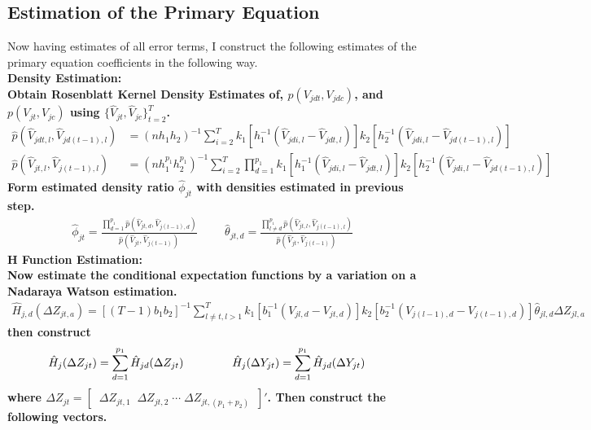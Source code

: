 \documentclass[10pt]{article}
\begin{document}
\subsection*{Estimation of the Primary Equation} 
%
Now having estimates of all error terms, I construct the following estimates of the primary equation coefficients in the following way. \\
%
\noindent \bf Density Estimation: \rm  \\
%
Obtain Rosenblatt Kernel Density Estimates of, $p(V_{jdt},V_{jdc})$, and $p(V_{jt},V_{jc})$ using $\{\hat{V}_{jt}, \hat{V}_{jc}\}_{t=2}^T$.  
\begin{align*} 
 \hat{p}(\hat{V}_{jdt,l},\hat{V}_{jd(t-1),l}) 
&= (nh_1h_2)^{-1}\sum_{ i = 2 }^T k_1[h_1^{-1}(\hat{V}_{jdi,l} -\hat{V}_{jdt,l})]k_2[h_2^{-1}(\hat{V}_{jdi,l} -\hat{V}_{jd(t-1),l})]  \\
%
 \hat{p}(\hat{V}_{jt,l},\hat{V}_{j(t-1),l}) 
&= (nh_1^{p_1}h_2^{p_1})^{-1}\sum_{ i = 2 }^T \prod_{d=1}^{p_1} k_1[h_1^{-1}(\hat{V}_{jdi,l} -\hat{V}_{jdt,l})]k_2[h_2^{-1}(\hat{V}_{jdi,l} -\hat{V}_{jd(t-1),l})] 
\end{align*}
 Form estimated density ratio $\hat{\phi}_{jt}$ with densities estimated in previous step. 
\begin{align*} 
\hat{\phi}_{jt} = \frac{ \prod_{d=1}^{p_1}\hat{p}(\hat{V}_{jt,d},\hat{V}_{j(t-1),d}) }{\hat{p}(\hat{V}_{jt},\hat{V}_{j(t-1)})}
%
\hspace{1cm}
%
\hat{\theta}_{jt,d} = \frac{ \prod_{l \neq d}^{p_1}\hat{p}(\hat{V}_{jt,l},\hat{V}_{j(t-1),l}) }{\hat{p}(\hat{V}_{jt},\hat{V}_{j(t-1)})}
\end{align*}
%
\noindent \bf H Function Estimation:  \rm  \\
%
Now estimate the conditional expectation functions by a variation on a Nadaraya Watson estimation. 
\begin{align*} 
 \hat{H}_{j,d}(\Delta Z_{jt,a}) = [(T-1)b_1b_2]^{-1} \sum_{l \neq t , l > 1}^T k_1[b_1^{-1}(V_{jl,d} - V_{jt,d})] k_2[b_2^{-1}(V_{j(l-1),d} - V_{j(t-1),d})] \hat{\theta}_{jl,d} \Delta Z_{jl,a}
 \end{align*}
then construct 
    \begin{align*} 
    \hat{H}_j(\Delta Z_{jt}) &= \sum_{d=1}^{p_1} \hat{H}_{jd}(\Delta Z_{jt})  \hspace{1.5cm}
%
\hat{H}_j(\Delta Y_{jt}) = \sum_{d=1}^{p_1} \hat{H}_{jd}(\Delta Y_{jt}) 
    \end{align*}
where $ \Delta Z_{jt}  = [ \; \; \Delta Z_{jt,1}    \;\;    \Delta Z_{jt,2}     \;   \cdots \; \Delta Z_{jt,(p_1+p_2)} \;\; ]'$. Then construct the following vectors. 
\end{document}
